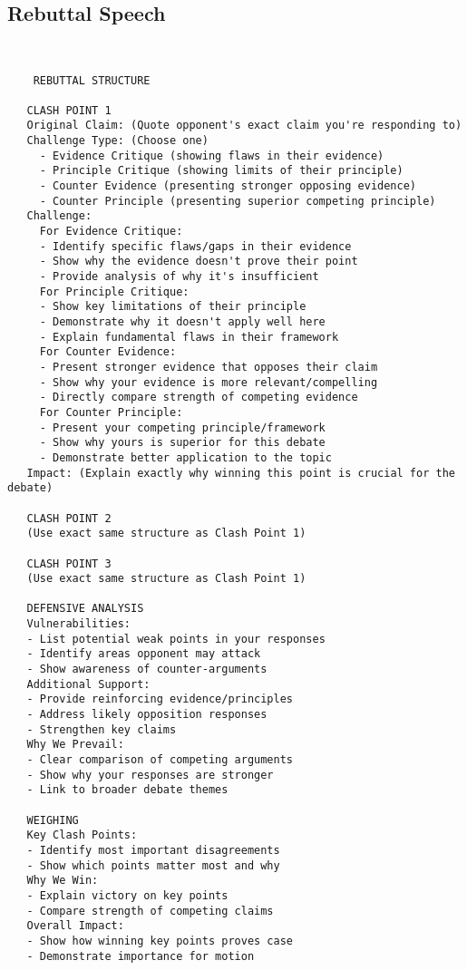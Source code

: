 \documentclass{article}
\begin{document}
  \subsection{Rebuttal Speech}
  \begin{verbatim}


    REBUTTAL STRUCTURE

   CLASH POINT 1
   Original Claim: (Quote opponent's exact claim you're responding to)
   Challenge Type: (Choose one)
     - Evidence Critique (showing flaws in their evidence)
     - Principle Critique (showing limits of their principle)
     - Counter Evidence (presenting stronger opposing evidence)
     - Counter Principle (presenting superior competing principle)
   Challenge:
     For Evidence Critique:
     - Identify specific flaws/gaps in their evidence
     - Show why the evidence doesn't prove their point
     - Provide analysis of why it's insufficient
     For Principle Critique:
     - Show key limitations of their principle
     - Demonstrate why it doesn't apply well here
     - Explain fundamental flaws in their framework
     For Counter Evidence:
     - Present stronger evidence that opposes their claim
     - Show why your evidence is more relevant/compelling
     - Directly compare strength of competing evidence
     For Counter Principle:
     - Present your competing principle/framework
     - Show why yours is superior for this debate
     - Demonstrate better application to the topic
   Impact: (Explain exactly why winning this point is crucial for the debate)

   CLASH POINT 2
   (Use exact same structure as Clash Point 1)

   CLASH POINT 3
   (Use exact same structure as Clash Point 1)

   DEFENSIVE ANALYSIS
   Vulnerabilities:
   - List potential weak points in your responses
   - Identify areas opponent may attack
   - Show awareness of counter-arguments
   Additional Support:
   - Provide reinforcing evidence/principles
   - Address likely opposition responses
   - Strengthen key claims
   Why We Prevail:
   - Clear comparison of competing arguments
   - Show why your responses are stronger
   - Link to broader debate themes

   WEIGHING
   Key Clash Points:
   - Identify most important disagreements
   - Show which points matter most and why
   Why We Win:
   - Explain victory on key points
   - Compare strength of competing claims
   Overall Impact:
   - Show how winning key points proves case
   - Demonstrate importance for motion


\end{verbatim}
\end{document}
